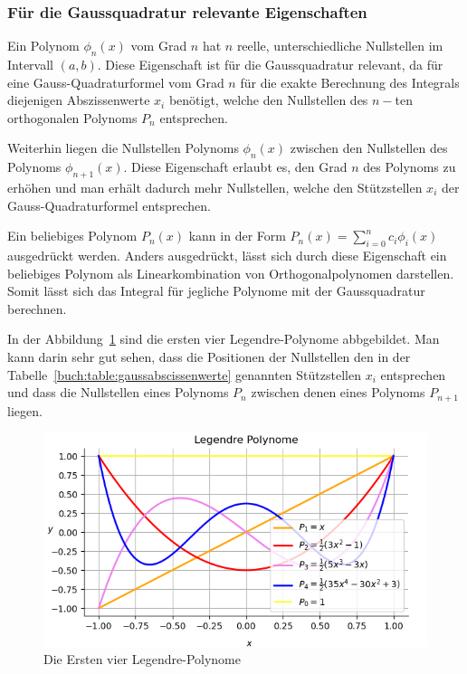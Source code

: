 \subsubsection{Für die Gaussquadratur relevante Eigenschaften}

Ein Polynom $\phi_{n}(x)$ vom Grad $n$ hat $n$ reelle, 
unterschiedliche Nullstellen im Intervall $(a, b)$.
Diese Eigenschaft ist für die Gaussquadratur relevant, 
da für eine Gauss-Quadraturformel vom Grad $n$ für die exakte Berechnung 
des Integrals diejenigen Abszissenwerte $x_{i}$ benötigt, 
welche den Nullstellen des $n-$ten orthogonalen Polynoms $P_{n}$ entsprechen.
\newline

\noindent
Weiterhin liegen die Nullstellen Polynoms $\phi_{n}(x)$ zwischen den Nullstellen des Polynoms $\phi_{n+1}(x)$.
Diese Eigenschaft erlaubt es, den Grad $n$ des Polynoms zu erhöhen und man erhält dadurch 
mehr Nullstellen, welche den Stützstellen $x_{i}$ der Gauss-Quadraturformel entsprechen.

Ein beliebiges Polynom $P_{n}(x)$ kann in der Form 
$P_{n}(x) = \sum_{i=0}^{n} c_{i}\phi_{i}(x)$ ausgedrückt werden.
Anders ausgedrückt, lässt sich durch diese Eigenschaft ein beliebiges Polynom als
Linearkombination von Orthogonalpolynomen darstellen. 
Somit lässt sich das Integral für jegliche Polynome mit der Gaussquadratur berechnen.
\newline

\noindent
In der Abbildung~\ref{quadratur:figure:legendrepolynomial} sind die ersten vier
Legendre-Polynome abbgebildet. Man kann darin sehr gut sehen, 
dass die Positionen der Nullstellen den in der 
Tabelle~\ref{buch:table:gaussabscissenwerte} genannten Stützstellen $x_{i}$ 
entsprechen und dass die Nullstellen eines Polynoms $P_{n}$ zwischen denen 
eines Polynoms $P_{n+1}$ liegen.

\begin{figure}[!h]
    \centering
    \includegraphics[scale=0.7]{papers/quadratur/figures/Legendrepolynomial.png}
    \caption{ Die Ersten vier Legendre-Polynome
    \label{quadratur:figure:legendrepolynomial}}
\end{figure}
\newpage

